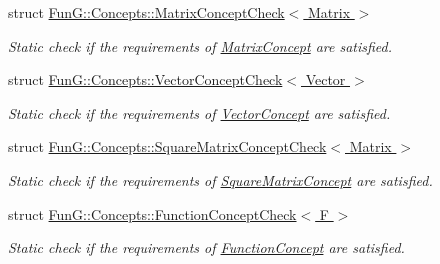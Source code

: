 \begin{DoxyCompactItemize}
struct \hyperlink{structFunG_1_1Concepts_1_1MatrixConceptCheck}{Fun\-G\-::\-Concepts\-::\-Matrix\-Concept\-Check$<$ Matrix $>$}
\begin{DoxyCompactList}\small\item\em Static check if the requirements of \hyperlink{structFunG_1_1Concepts_1_1MatrixConcept}{Matrix\-Concept} are satisfied. \end{DoxyCompactList}\item 
struct \hyperlink{structFunG_1_1Concepts_1_1VectorConceptCheck}{Fun\-G\-::\-Concepts\-::\-Vector\-Concept\-Check$<$ Vector $>$}
\begin{DoxyCompactList}\small\item\em Static check if the requirements of \hyperlink{structFunG_1_1Concepts_1_1VectorConcept}{Vector\-Concept} are satisfied. \end{DoxyCompactList}\item 
struct \hyperlink{structFunG_1_1Concepts_1_1SquareMatrixConceptCheck}{Fun\-G\-::\-Concepts\-::\-Square\-Matrix\-Concept\-Check$<$ Matrix $>$}
\begin{DoxyCompactList}\small\item\em Static check if the requirements of \hyperlink{structFunG_1_1Concepts_1_1SquareMatrixConcept}{Square\-Matrix\-Concept} are satisfied. \end{DoxyCompactList}\item 
struct \hyperlink{structFunG_1_1Concepts_1_1FunctionConceptCheck}{Fun\-G\-::\-Concepts\-::\-Function\-Concept\-Check$<$ F $>$}
\begin{DoxyCompactList}\small\item\em Static check if the requirements of \hyperlink{structFunG_1_1Concepts_1_1FunctionConcept}{Function\-Concept} are satisfied. \end{DoxyCompactList}\end{DoxyCompactItemize}
